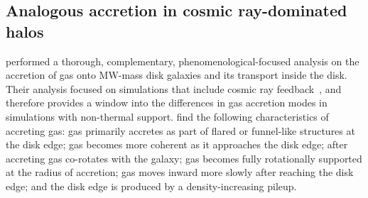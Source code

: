 \documentclass[fleqn,usenatbib]{mnras}
\begin{document}


\subsection{Analogous accretion in cosmic ray-dominated halos}
\label{s: crs}

\cite{Trapp2021} performed a thorough, complementary, phenomenological-focused analysis on the accretion of gas onto MW-mass disk galaxies and its transport inside the disk.
Their analysis focused on simulations that include cosmic ray feedback~\citep[][]{Chan2019, Hopkins2020a}, and therefore provides a window into the differences in gas accretion modes in simulations with non-thermal support.
\citeauthor{Trapp2021} find the following characteristics of accreting gas:
gas primarily accretes as part of flared or funnel-like structures at the disk edge;
gas becomes more coherent as it approaches the disk edge;
after accreting gas co-rotates with the galaxy;
gas becomes fully rotationally supported at the radius of accretion;
gas moves inward more slowly after reaching the disk edge;
and the disk edge is produced by a density-increasing pileup.
\end{document}
